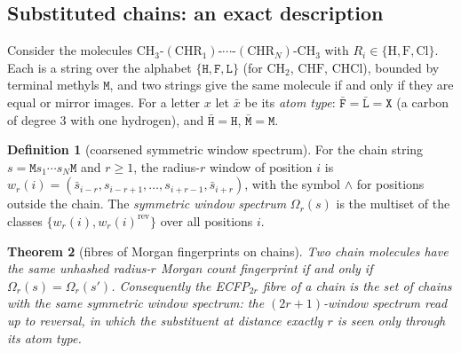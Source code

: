 \documentclass[11pt]{article}
\theoremstyle{plain}
\newtheorem{theorem}{Theorem}
\theoremstyle{definition}
\newtheorem{definition}[theorem]{Definition}
\theoremstyle{remark}
\begin{document}
\subsection{Substituted chains: an exact description}

Consider the molecules $\mathrm{CH_3}$-$(\mathrm{CHR}_1)$-$\cdots$-$(\mathrm{CHR}_N)$-$\mathrm{CH_3}$ with
$R_i\in\{\mathrm H,\mathrm F,\mathrm{Cl}\}$. Each is a string over the alphabet $\{\mathtt H,\mathtt F,\mathtt L\}$
(for $\mathrm{CH_2}$, $\mathrm{CHF}$, $\mathrm{CHCl}$), bounded by terminal methyls $\mathtt M$, and two strings give
the same molecule if and only if they are equal or mirror images. For a letter $x$ let $\bar x$ be its \emph{atom
type}: $\bar{\mathtt F}=\bar{\mathtt L}=\mathtt X$ (a carbon of degree $3$ with one hydrogen), and
$\bar{\mathtt H}=\mathtt H$, $\bar{\mathtt M}=\mathtt M$.

\begin{definition}[coarsened symmetric window spectrum]\label{def:window}
For the chain string $s=\mathtt M s_1\cdots s_N\mathtt M$ and $r\ge1$, the radius-$r$ window of position $i$ is
$w_r(i)=(\bar s_{i-r},s_{i-r+1},\dots,s_{i+r-1},\bar s_{i+r})$, with the symbol $\wedge$ for positions outside the
chain. The \emph{symmetric window spectrum} $\Omega_r(s)$ is the multiset of the classes $\{w_r(i),w_r(i)^{\mathrm{rev}}\}$
over all positions $i$.
\end{definition}

\begin{theorem}[fibres of Morgan fingerprints on chains]\label{thm:chain}
Two chain molecules have the same unhashed radius-$r$ Morgan count fingerprint if and only if
$\Omega_r(s)=\Omega_r(s')$. Consequently the ECFP$_{2r}$ fibre of a chain is the set of chains with the same
symmetric window spectrum: the $(2r+1)$-window spectrum read up to reversal, in which the substituent at
distance exactly $r$ is seen only through its atom type.
\end{theorem}
\end{document}
